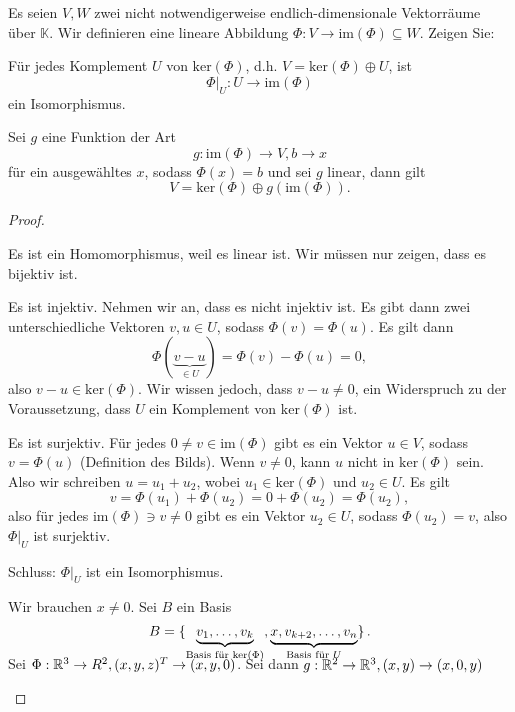 \begin{Problem}
	Es seien $V,W$ zwei nicht notwendigerweise endlich-dimensionale Vektorräume über $\mathbb{K}$. Wir definieren eine lineare Abbildung $\Phi:V\to \text{im}(\Phi)\subseteq W$. Zeigen Sie:
	\begin{parts}
		\item F\"{u}r jedes Komplement $U$ von $\text{ker}(\Phi)$, d.h. $V=\text{ker}(\Phi)\oplus U$, ist
		\[
			\Phi|_U:U\to\text{im}(\Phi)
		\]
		ein Isomorphismus.
	\item Sei $g$ eine Funktion der Art
		\[
			g:\text{im}(\Phi)\to V, b\to x
		\]
für ein ausgewähltes $x$, sodass $\Phi(x)=b$ und sei $g$ linear, dann gilt
\[
	V=\text{ker}(\Phi)\oplus g(\text{im}(\Phi))
.\] 
	\end{parts}
\end{Problem}
\begin{proof}
	\begin{parts}
	\item Es ist ein Homomorphismus, weil es linear ist. Wir müssen nur zeigen, dass es bijektiv ist.

		Es ist injektiv. Nehmen wir an, dass es nicht injektiv ist. Es gibt dann zwei unterschiedliche Vektoren $v,u\in U$, sodass $\Phi(v)=\Phi(u)$. Es gilt dann
		\[
			\Phi(\underbrace{v-u}_{\in U})=\Phi(v)-\Phi(u)=0
		,\]
		also $v-u\in\text{ker}(\Phi)$. Wir wissen jedoch, dass $v-u\neq 0$, ein Widerspruch zu der Voraussetzung, dass $U$ ein Komplement von $\text{ker}(\Phi)$ ist.

		Es ist surjektiv. F\"{u}r jedes $0\neq v\in \text{im}(\Phi)$ gibt es ein Vektor $u\in V$, sodass $v=\Phi(u)$ (Definition des Bilds). Wenn $v\neq 0$, kann $u$ nicht in $\text{ker}(\Phi)$ sein. Also wir schreiben $u=u_1+u_2$, wobei $u_1\in \text{ker}(\Phi)$ und $u_2\in U$. Es gilt
		\[
		v=\Phi(u_1)+\Phi(u_2)=0+\Phi(u_2)=\Phi(u_2)
		,\]
		also f\"{u}r jedes $\text{im}(\Phi)\ni v\neq 0$ gibt es ein Vektor $u_2\in U$, sodass $\Phi(u_2)=v$, also $\Phi|_U$ ist surjektiv.

		Schluss: $\Phi|_U$ ist ein Isomorphismus.
	\item Wir brauchen $x \neq 0$. Sei $B$ ein Basis
		\[
			B=\left\{\smash{\underbrace{v_1,\dots, v_k}_{\text{Basis f\"{u}r ker}(\Phi)}, \underbrace{x, v_{k+2}, \dots, v_n}_{\text{Basis f\"{u}r }U}}\vphantom{v_1}\right\} 
		.\] 

	Sei $\Phi:\mathbb{R}^3\to R^2, (x,y,z)^T\to (x,y,0)$. Sei dann $g: \mathbb{R}^2\to \mathbb{R}^3, (x,y)\to (x,0,y)$
	\end{parts}
\end{proof}

